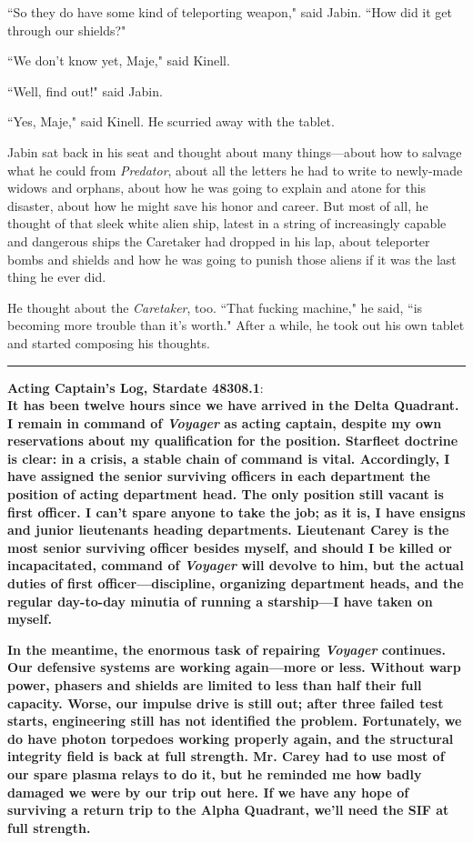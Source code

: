 \documentclass[twoside,letterpaper,12pt]{memoir}
\begin{document}
``So they do have some kind of teleporting weapon," said Jabin. ``How did it get through our shields?"

``We don't know yet, Maje," said Kinell.

``Well, find out!" said Jabin.

``Yes, Maje," said Kinell. He scurried away with the tablet.

Jabin sat back in his seat and thought about many things---about how to salvage what he could from \textit{Predator}, about all the letters he had to write to newly-made widows and orphans, about how he was going to explain and atone for this disaster, about how he might save his honor and career. But most of all, he thought of that sleek white alien ship, latest in a string of increasingly capable and dangerous ships the Caretaker had dropped in his lap, about teleporter bombs and shields and how he was going to punish those aliens if it was the last thing he ever did.

He thought about the \textit{Caretaker}, too. ``That fucking machine," he said, ``is becoming more trouble than it's worth." After a while, he took out his own tablet and started composing his thoughts.

\fancybreak{\rule{3cm}{0.4 pt}}
\noindent\textbf{Acting Captain's Log, Stardate 48308.1}:\\

\textbf{It has been twelve hours since we have arrived in the Delta Quadrant. I remain in command of \textit{Voyager} as acting captain, despite my own reservations about my qualification for the position. Starfleet doctrine is clear: in a crisis, a stable chain of command is vital. Accordingly, I have assigned the senior surviving officers in each department the position of acting department head. The only position still vacant is first officer. I can't spare anyone to take the job; as it is, I have ensigns and junior lieutenants heading departments. Lieutenant Carey is the most senior surviving officer besides myself, and should I be killed or incapacitated, command of \textit{Voyager} will devolve to him, but the actual duties of first officer---discipline, organizing department heads, and the regular day-to-day minutia of running a starship---I have taken on myself.}

\textbf{In the meantime, the enormous task of repairing \textit{Voyager} continues. Our defensive systems are working again---more or less. Without warp power, phasers and shields are limited to less than half their full capacity. Worse, our impulse drive is still out; after three failed test starts, engineering still has not identified the problem. Fortunately, we do have photon torpedoes working properly again, and the structural integrity field is back at full strength. Mr. Carey had to use most of our spare plasma relays to do it, but he reminded me how badly damaged we were by our trip out here. If we have any hope of surviving a return trip to the Alpha Quadrant, we'll need the SIF at full strength.}
\end{document}
